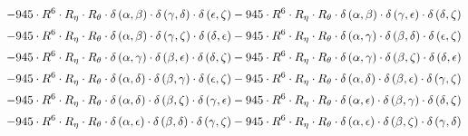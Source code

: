 \begin{subequations}
\begin{gather}
 \\[0.2em] \notag 		 - 945 \cdot R^{6} \cdot R_{\eta{}} \cdot R_{\theta{}} \cdot \delta{}\left(\alpha{}, \beta{}\right) \cdot \delta{}\left(\gamma{}, \delta{}\right) \cdot \delta{}\left(\epsilon{}, \zeta{}\right)- 945 \cdot R^{6} \cdot R_{\eta{}} \cdot R_{\theta{}} \cdot \delta{}\left(\alpha{}, \beta{}\right) \cdot \delta{}\left(\gamma{}, \epsilon{}\right) \cdot \delta{}\left(\delta{}, \zeta{}\right) 
 \\[0.2em] \notag 		 - 945 \cdot R^{6} \cdot R_{\eta{}} \cdot R_{\theta{}} \cdot \delta{}\left(\alpha{}, \beta{}\right) \cdot \delta{}\left(\gamma{}, \zeta{}\right) \cdot \delta{}\left(\delta{}, \epsilon{}\right)- 945 \cdot R^{6} \cdot R_{\eta{}} \cdot R_{\theta{}} \cdot \delta{}\left(\alpha{}, \gamma{}\right) \cdot \delta{}\left(\beta{}, \delta{}\right) \cdot \delta{}\left(\epsilon{}, \zeta{}\right) 
 \\[0.2em] \notag 		 - 945 \cdot R^{6} \cdot R_{\eta{}} \cdot R_{\theta{}} \cdot \delta{}\left(\alpha{}, \gamma{}\right) \cdot \delta{}\left(\beta{}, \epsilon{}\right) \cdot \delta{}\left(\delta{}, \zeta{}\right)- 945 \cdot R^{6} \cdot R_{\eta{}} \cdot R_{\theta{}} \cdot \delta{}\left(\alpha{}, \gamma{}\right) \cdot \delta{}\left(\beta{}, \zeta{}\right) \cdot \delta{}\left(\delta{}, \epsilon{}\right) 
 \\[0.2em] \notag 		 - 945 \cdot R^{6} \cdot R_{\eta{}} \cdot R_{\theta{}} \cdot \delta{}\left(\alpha{}, \delta{}\right) \cdot \delta{}\left(\beta{}, \gamma{}\right) \cdot \delta{}\left(\epsilon{}, \zeta{}\right)- 945 \cdot R^{6} \cdot R_{\eta{}} \cdot R_{\theta{}} \cdot \delta{}\left(\alpha{}, \delta{}\right) \cdot \delta{}\left(\beta{}, \epsilon{}\right) \cdot \delta{}\left(\gamma{}, \zeta{}\right) 
 \\[0.2em] \notag 		 - 945 \cdot R^{6} \cdot R_{\eta{}} \cdot R_{\theta{}} \cdot \delta{}\left(\alpha{}, \delta{}\right) \cdot \delta{}\left(\beta{}, \zeta{}\right) \cdot \delta{}\left(\gamma{}, \epsilon{}\right)- 945 \cdot R^{6} \cdot R_{\eta{}} \cdot R_{\theta{}} \cdot \delta{}\left(\alpha{}, \epsilon{}\right) \cdot \delta{}\left(\beta{}, \gamma{}\right) \cdot \delta{}\left(\delta{}, \zeta{}\right) 
 \\[0.2em] \notag 		 - 945 \cdot R^{6} \cdot R_{\eta{}} \cdot R_{\theta{}} \cdot \delta{}\left(\alpha{}, \epsilon{}\right) \cdot \delta{}\left(\beta{}, \delta{}\right) \cdot \delta{}\left(\gamma{}, \zeta{}\right)- 945 \cdot R^{6} \cdot R_{\eta{}} \cdot R_{\theta{}} \cdot \delta{}\left(\alpha{}, \epsilon{}\right) \cdot \delta{}\left(\beta{}, \zeta{}\right) \cdot \delta{}\left(\gamma{}, \delta{}\right) 

\end{gather}
\end{subequations}
